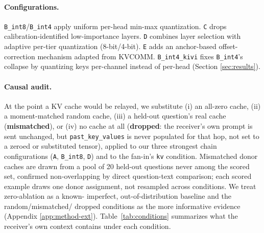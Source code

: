 \documentclass[11pt]{article}
\begin{document}
\paragraph{Configurations.} \texttt{B\_int8}/\texttt{B\_int4} apply
uniform per-head min-max quantization. \texttt{C} drops
calibration-identified low-importance layers. \texttt{D} combines
layer selection with adaptive per-tier quantization (8-bit/4-bit).
\texttt{E} adds an anchor-based offset-correction mechanism adapted
from KVCOMM. \texttt{B\_int4\_kivi} fixes \texttt{B\_int4}'s collapse by
quantizing keys per-channel instead of per-head (Section
\ref{sec:results}).

\paragraph{Causal audit.} At the point a KV cache would be relayed, we
substitute (i) an all-zero cache, (ii) a moment-matched random cache,
(iii) a held-out question's real cache (\textbf{mismatched}), or (iv)
no cache at all (\textbf{dropped}: the receiver's own prompt is sent
unchanged, but \texttt{past\_key\_values} is never populated for that
hop, not set to a zeroed or substituted tensor), applied to our three
strongest chain configurations (\texttt{A}, \texttt{B\_int8},
\texttt{D}) and to the fan-in's \texttt{kv} condition. Mismatched donor
caches are drawn from a pool of 20 held-out questions never among the
scored set, confirmed non-overlapping by direct question-text
comparison; each scored example draws one donor assignment, not
resampled across conditions. We treat zero-ablation as a known-
imperfect, out-of-distribution baseline and the random/mismatched/
dropped conditions as the more informative evidence (Appendix
\ref{app:method-ext}). Table~\ref{tab:conditions} summarizes what the
receiver's own context contains under each condition.
\end{document}
